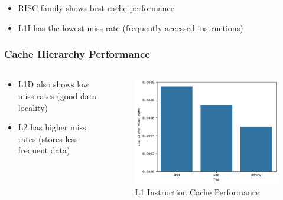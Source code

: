 \begin{frame}[fragile]
	\begin{itemize}
		\item RISC family shows best cache performance
		\item L1I has the lowest miss rate (frequently accessed instructions)
	\end{itemize}
\end{frame}

\begin{frame}
	\frametitle{Cache Hierarchy Performance}
	\begin{columns}
		\begin{column}{0.5\linewidth}
			\begin{itemize}
				\item L1D also shows low miss rates (good data locality)
				\item L2 has higher miss rates (stores less frequent data)
			\end{itemize}
		\end{column}
		\begin{column}{0.4\linewidth}
			\begin{figure}[h]
				\centering
				\includegraphics[width=\linewidth]{images/l1i.png}
				\caption{L1 Instruction Cache Performance}
			\end{figure}
		\end{column}
	\end{columns}
\end{frame}

